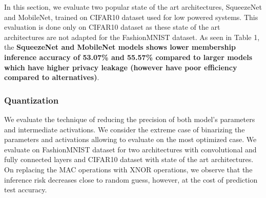 In this section, we evaluate two popular state of the art architectures, SqueezeNet and MobileNet, trained on CIFAR10 dataset used for low powered systems.
This evaluation is done only on CIFAR10 dataset as these state of the art architectures are not adapted for the FashionMNIST dataset.
As seen in Table 1, the \textbf{SqueezeNet and MobileNet models shows lower membership inference accuracy of 53.07\% and 55.57\% compared to larger models which have higher privacy leakage (however have poor efficiency compared to alternatives)}.




\subsubsection{Quantization}\label{quant}

We evaluate the technique of reducing the precision of both model's parameters and intermediate activations.
We consider the extreme case of binarizing the parameters and activations allowing to evaluate on the most optimized case.
We evaluate on FashionMNIST dataset for two architectures with convolutional and fully connected layers and CIFAR10 dataset with state of the art architectures.
On replacing the MAC operations with XNOR operations, we observe that the inference risk decreases close to random guess, however, at the cost of prediction test accuracy.

